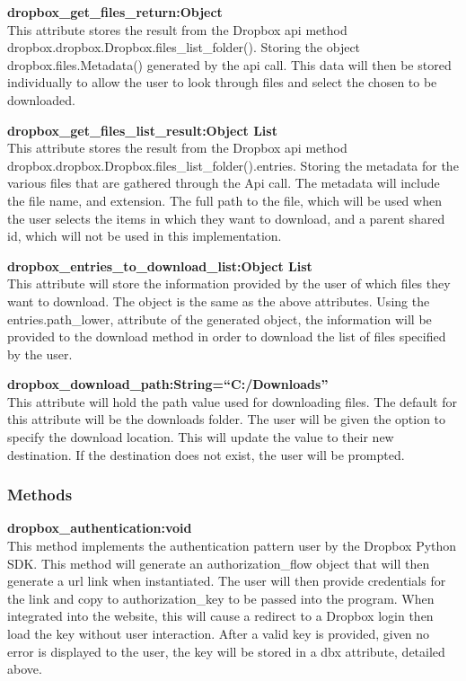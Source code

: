 \textbf{dropbox\_get\_files\_return:Object} \\
    This attribute stores the result from the Dropbox api method dropbox.dropbox.Dropbox.files\_list\_folder(). Storing the object 
    dropbox.files.Metadata() generated by the api call. This data will then be stored individually to allow the user to look through 
    files and select the chosen to be downloaded.

\textbf{dropbox\_get\_files\_list\_result:Object List} \\
    This attribute stores the result from the Dropbox api method dropbox.dropbox.Dropbox.files\_list\_folder().entries. Storing the metadata for 
    the various files that are gathered through the Api call. The metadata will include the file name, and extension. The full path to the file, 
    which will be used when the user selects the items in which they want to download, and a parent shared id, which will not be used in this 
    implementation.

\textbf{dropbox\_entries\_to\_download\_list:Object List} \\
    This attribute will store the information provided by the user of which files they want to download. The object is the same as the above 
    attributes. Using the entries.path\_lower, attribute of the generated object, the information will be provided to the download method in 
    order to download the list of files specified by the user.

\textbf{dropbox\_download\_path:String=``C:/Downloads''} \\
    This attribute will hold the path value used for downloading files. The default for this attribute will be the downloads folder. The user 
    will be given the option to specify the download location. This will update the value to their new destination. If the destination does 
    not exist, the user will be prompted.

\subsubsection{Methods}
\textbf{dropbox\_authentication:void} \\
    This method implements the authentication pattern user by the Dropbox Python SDK. This method will generate an authorization\_flow object
    that will then generate a url link when instantiated. The user will then provide credentials for the link and copy to authorization\_key 
    to be passed into the program. When integrated into the website, this will cause a redirect to a Dropbox login then load the key without 
    user interaction. After a valid key is provided, given no error is displayed to the user, the key will be stored in a dbx attribute, detailed 
    above.  

